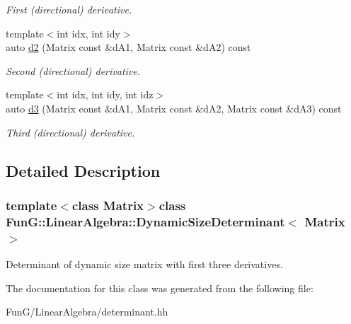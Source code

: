 \begin{DoxyCompactItemize}
\begin{DoxyCompactList}\small\item\em First (directional) derivative. \end{DoxyCompactList}\item 
\hypertarget{classFunG_1_1LinearAlgebra_1_1DynamicSizeDeterminant_a012fc1b7e116b65af25bf7985cecfcc1}{{\footnotesize template$<$int idx, int idy$>$ }\\auto \hyperlink{classFunG_1_1LinearAlgebra_1_1DynamicSizeDeterminant_a012fc1b7e116b65af25bf7985cecfcc1}{d2} (Matrix const \&d\-A1, Matrix const \&d\-A2) const }\label{classFunG_1_1LinearAlgebra_1_1DynamicSizeDeterminant_a012fc1b7e116b65af25bf7985cecfcc1}

\begin{DoxyCompactList}\small\item\em Second (directional) derivative. \end{DoxyCompactList}\item 
\hypertarget{classFunG_1_1LinearAlgebra_1_1DynamicSizeDeterminant_a9cadc3d8e2332f153f3f7e9c93232333}{{\footnotesize template$<$int idx, int idy, int idz$>$ }\\auto \hyperlink{classFunG_1_1LinearAlgebra_1_1DynamicSizeDeterminant_a9cadc3d8e2332f153f3f7e9c93232333}{d3} (Matrix const \&d\-A1, Matrix const \&d\-A2, Matrix const \&d\-A3) const }\label{classFunG_1_1LinearAlgebra_1_1DynamicSizeDeterminant_a9cadc3d8e2332f153f3f7e9c93232333}

\begin{DoxyCompactList}\small\item\em Third (directional) derivative. \end{DoxyCompactList}\end{DoxyCompactItemize}


\subsection{Detailed Description}
\subsubsection*{template$<$class Matrix$>$class Fun\-G\-::\-Linear\-Algebra\-::\-Dynamic\-Size\-Determinant$<$ Matrix $>$}

Determinant of dynamic size matrix with first three derivatives. 

The documentation for this class was generated from the following file\-:\begin{DoxyCompactItemize}
\item 
Fun\-G/\-Linear\-Algebra/determinant.\-hh\end{DoxyCompactItemize}
